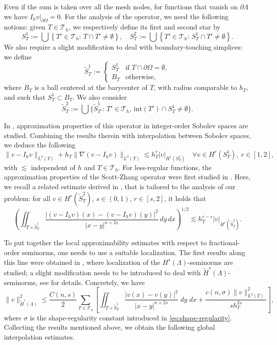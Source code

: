 \documentclass{amsart}
\newcommand{\domain}{\Lambda}
\newcommand{\Th}{{\mathcal {T}_h}}
\theoremstyle{plain}
\numberwithin{equation}{section}
\numberwithin{table}{section}
\numberwithin{figure}{section}
\numberwithin{theorem}{section}
\numberwithin{corollary}{section}
\numberwithin{definition}{section}
\numberwithin{lemma}{section}
\numberwithin{proposition}{section}
\numberwithin{remark}{section}
\begin{document}
Even if the sum is taken over all the mesh nodes, for functions that vanish on $\partial \domain$ we have $I_h v \big|_{\partial \Omega} = 0$. For the analysis of the operator, we need the following notions: given $T \in \Th$, we respectively define its first and second star by
\[
  S^1_T := \bigcup \left\{ T' \in \Th: \, T \cap T' \neq \emptyset \right\}, \quad
  S^2_T := \bigcup \left\{ T' \in \Th: \, S^1_T \cap T' \neq \emptyset \right\}.
\]
We also require a slight modification to deal with boundary-touching simplices: we define
\begin{equation*}
\widetilde{S}_T^1 :=
\left\lbrace \begin{array}{rl}
  S_T^1   & \textrm{if } T \cap \partial\Omega = \emptyset,
  \\
  B_T    & \textrm{otherwise,}
\end{array}\right.
\end{equation*}
where $B_T$ is a ball centered at the barycenter of $T$, with radius comparable to $h_T$, and such that $S_T^1\subset B_T$. We also consider
\[
\widetilde{S}_T^2 := \bigcup \big\{ \widetilde{S}_{T'}^1 \colon \, T' \in \Th, \, \mbox{int}(T') \cap S_T^1 \neq \emptyset \big\}.
\]


In \cite[Section 4]{ScottZhang}, approximation properties of this operator in integer-order Sobolev spaces are studied. Combining the results therein with interpolation between Sobolev spaces, we deduce the following
\[
\| v - I_h v \|_{L^2(T)} + h_T \| \nabla (v - I_h v) \|_{L^2(T)} \lesssim h_T^r |v|_{H^r(S^1_T)} \quad \forall v \in H^r(S^1_T), \ r \in [1, 2],
\]
with $\lesssim$ independent of $h$ and $T\in\Th$.
For less-regular functions, the approximation properties of the Scott-Zhang operator were first studied in \cite{Ciarlet}. Here, we recall a related estimate derived in \cite{AcBo17,BoNo23-2}, that is tailored to the analysis of our problem: for all  $v \in H^r(\widetilde{S}_T^2)$, $s \in (0,1)$, $r \in [s,2]$, it holds that
\[
\left(\iint_{T \times \widetilde{S}_T^1}  \frac{|(v-I_h v) (x) - (v-I_h v) (y)|^2}{|x-y|^{n+2s}} \, dy \, dx \right)^{1/2} \lesssim h_T^{r-s} |v|_{H^r(\widetilde{S}_T^2)}.
\]

To put together the local approximability estimates with respect to fractional-order seminorms, one needs to use a suitable localization. The first results along this line were obtained in \cite{Faermann2, Faermann}, where localization of the $H^s(\domain)$-seminorms are studied; a slight modification needs to be introduced to deal with $\widetilde H^s(\domain)$-seminorms, see \cite[Section 4.1]{BoNo23-2} for details. Concretely, we have
\begin{equation} \label{eq:localization-F-tilde}
 \|v\|_{\widetilde H^s(\domain)}^2 \le \frac{C(n,s)}2 \sum_{T \in \Th} \left[ \iint_{T \times \widetilde{S}_T^1}\!  \frac{|v (x) - v (y)|^2}{|x-y |^{n+2s}} \; dy \; dx + \frac{ c(n,\sigma) \| v \|^2_{L^2(T)}}{s h_T^{2s}} \right],
\end{equation}
where $\sigma$ is the shape-regularity constant introduced in \eqref{eq:shape-regularity}. Collecting the results mentioned above, we obtain the following global interpolation estimates.
\end{document}
